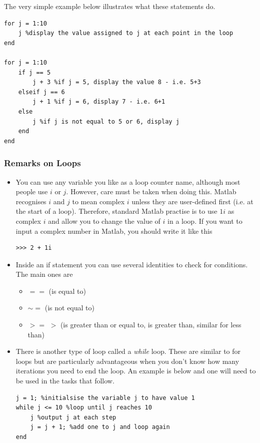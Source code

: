 \documentclass[12pt]{report}
\begin{document}
The very simple example below illustrates what these statements do.

\begin{lstlisting}
for j = 1:10
	j %display the value assigned to j at each point in the loop
end

for j = 1:10
	if j == 5
		j + 3 %if j = 5, display the value 8 - i.e. 5+3
	elseif j == 6
		j + 1 %if j = 6, display 7 - i.e. 6+1
	else
		j %if j is not equal to 5 or 6, display j
	end
end

\end{lstlisting}

\subsubsection{Remarks on Loops}

\begin{itemize}
\item You can use any variable you like as a loop counter name, although most people use $i$ or $j$. However, care must be taken when doing this. Matlab recognises $i$ and $j$ to mean complex $i$ unless they are user-defined first (i.e. at the start of a loop). Therefore, standard Matlab practise is to use $1i$ as complex $i$ and allow you to change the value of $i$ in a loop. If you want to input a complex number in Matlab, you should write it like this
\begin{lstlisting}
>>> 2 + 1i
\end{lstlisting}
\item Inside an if statement you can use several identities to check for conditions. The main ones are 
\begin{itemize}
\item $==$ (is equal to)
\item $\sim =$ (is not equal to)
\item $>=$ $>$ (is greater than or equal to, is greater than, similar for less than)
\end{itemize}
\item There is another type of loop called a \textit{while} loop. These are similar to for loops but are particularly advantageous when you don't know how many iterations you need to end the loop. An example is below and one will need to be used in the tasks that follow.
\clearpage
\begin{lstlisting}
j = 1; %initialsise the variable j to have value 1
while j <= 10 %loop until j reaches 10
    j %output j at each step
    j = j + 1; %add one to j and loop again
end
\end{lstlisting}
\end{itemize}
\end{document}
